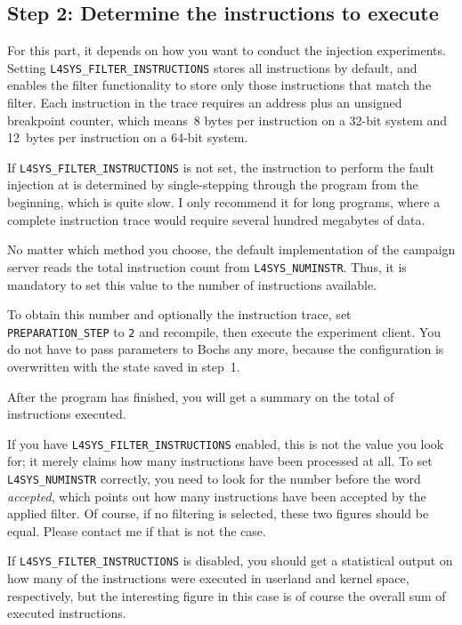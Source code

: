 \documentclass[a4paper,times,9pt]{article}
\begin{document}
\subsection{Step 2: Determine the instructions to execute}

For this part, it depends on how you want to conduct the injection
experiments. Setting \verb+L4SYS_FILTER_INSTRUCTIONS+
stores all instructions by default, and
enables the filter functionality to store only those
instructions that match the filter.
Each instruction in the trace requires
an address plus an unsigned breakpoint counter,
which means~8 bytes per instruction on a 32-bit system
and 12~bytes per instruction on a 64-bit system.

If \verb+L4SYS_FILTER_INSTRUCTIONS+ is not set, the instruction
to perform the fault injection at is determined by single-stepping
through the program from the beginning, which is quite slow.
I only recommend it for long programs, where a complete
instruction trace would require several hundred megabytes of data.

No matter which method you choose, the default implementation
of the campaign server reads the total instruction count
from \verb+L4SYS_NUMINSTR+. Thus, it is mandatory to set this
value to the number of instructions available.

To obtain this number and optionally the instruction trace,
set \verb+PREPARATION_STEP+ to \texttt{2} and recompile, then execute
the experiment client. You do not have to pass parameters to Bochs
any more, because the configuration is overwritten with the
state saved in step~1.

After the program has finished, you will get a summary on the
total of instructions executed.

If you have
\verb+L4SYS_FILTER_INSTRUCTIONS+ enabled, this is not the
value you look for; it merely claims how many
instructions have been processed at all.
To set \verb+L4SYS_NUMINSTR+ correctly, you need to look for the
number before the word \emph{accepted}, which points out how many
instructions have been accepted by the applied filter. Of course,
if no filtering is selected, these two figures should be equal.
Please contact me if that is not the case.

If \verb+L4SYS_FILTER_INSTRUCTIONS+ is disabled, you should
get a statistical output on how many of the instructions
were executed in userland and kernel space, respectively,
but the interesting figure in this case is of course the overall
sum of executed instructions.
\end{document}
